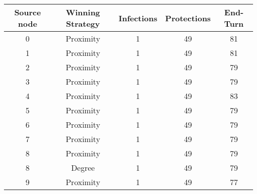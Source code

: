 \documentclass[results.tex]{subfiles}
\begin{document}
    \begin{center}
        \begin{tabular}{| c || c | c | c | c |}
            \hline
            {\bfseries Source node} & {\bfseries Winning Strategy} & {\bfseries Infections} & {\bfseries Protections}
            & {\bfseries End-Turn}
            \\  %
            \hline\hline
            0                       & Proximity                    & 1                      & 49                      & 81                   \\
            \hline
            1                       & Proximity                    & 1                      & 49                      & 81                   \\
            \hline
            2                       & Proximity                    & 1                      & 49                      & 79                   \\
            \hline
            3                       & Proximity                    & 1                      & 49                      & 79                   \\
            \hline
            4                       & Proximity                    & 1                      & 49                      & 83                   \\
            \hline
            5                       & Proximity                    & 1                      & 49                      & 79                   \\
            \hline
            6                       & Proximity                    & 1                      & 49                      & 79                   \\
            \hline
            7                       & Proximity                    & 1                      & 49                      & 79                   \\
            \hline
            8                       & Proximity                    & 1                      & 49                      & 79                   \\
            \hline
            8                       & Degree                       & 1                      & 49                      & 79                   \\
            \hline
            9                       & Proximity                    & 1                      & 49                      & 77                   \\

\end{tabular}
\end{center}
\end{document}
